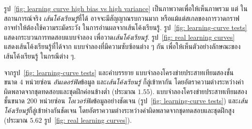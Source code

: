 รูป~\ref{fig: learning curve high bias vs high variance} เป็นภาพวาดเพื่อให้เห็นภาพรวม
แต่
ในสถานการณ์จริง \textit{เส้นโค้งเรียนรู้}ที่ได้
อาจจะมีสัญญาณรบกวนมาก 
หรือแม้แต่สเกลของการวาดกราฟ
อาจทำให้ต้องใช้ความระมัดระวัง
ในการอ่านผลจากเส้นโค้งเรียนรู้.
%
รูป~\ref{fig: learning-curve tests}
แสดงกระบวนการทดสอบแบบจำลอง เพื่อวาด\textit{เส้นโค้งเรียนรู้}.
รูป~\ref{fig: real learning curves} แสดงเส้นโค้งเรียนรู้ที่ได้จาก
แบบจำลองที่มีความซับซ้อนต่าง ๆ กัน
เพื่อให้เห็นตัวอย่างลักษณะของเส้นโค้งเรียนรู้
ในกรณีต่าง ๆ.
%
%

จากรูป~\ref{fig: learning-curve tests} และคำบรรยาย
แบบจำลองโครงข่ายประสาทเทียมสองชั้น
ขนาด $4$ หน่วยซ่อน \textit{อันเดอร์ฟิต}ข้อมูล
และ\textit{เส้นโค้งเรียนรู้} ก็ลู่เข้าหากัน
โดยอัตราความต่างระหว่างค่าผิดพลาดจากชุดทดสอบและชุดฝึกค่อนข้างต่ำ (ประมาณ $1.55$).
แบบจำลองโครงข่ายประสาทเทียมสองชั้นขนาด $200$ หน่วยซ่อน \textit{โอเวอร์ฟิต}ข้อมูลอย่างชัดเจน (รูป~\ref{fig: learning-curve tests})
และ\textit{เส้นโค้งเรียนรู้}ก็ลู่เข้าห่างกันชัดเจน
โดยอัตราความต่างระหว่างค่าผิดพลาดจากชุดทดสอบและชุดฝึกสูง (ประมาณ $5.62$ รูป~\ref{fig: real learning curves}).



